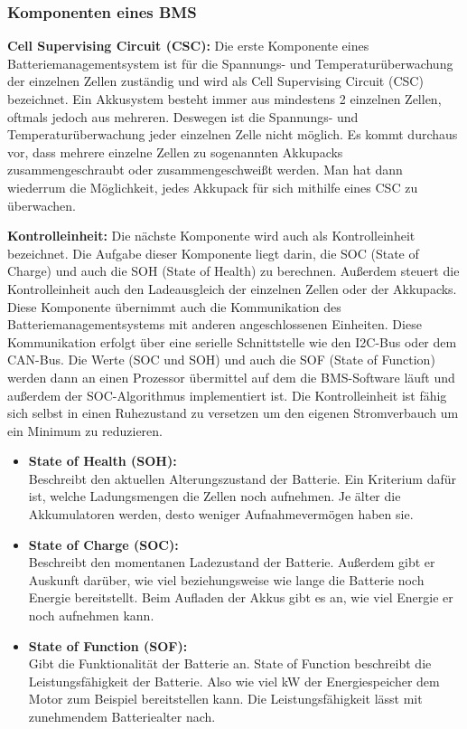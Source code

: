 \subsubsection{Komponenten eines BMS}

\textbf{Cell Supervising Circuit (CSC):}
Die erste Komponente eines Batteriemanagementsystem ist für die Spannungs- und Temperaturüberwachung der einzelnen Zellen zuständig und wird als Cell Supervising Circuit (CSC) bezeichnet. Ein Akkusystem besteht immer aus mindestens 2 einzelnen Zellen, oftmals jedoch aus mehreren. Deswegen ist die Spannungs- und Temperaturüberwachung jeder einzelnen Zelle nicht möglich. Es kommt  durchaus vor, dass mehrere einzelne Zellen zu sogenannten Akkupacks zusammengeschraubt oder zusammengeschweißt werden. Man hat dann wiederrum die Möglichkeit, jedes Akkupack für sich mithilfe eines CSC zu überwachen.

\textbf{Kontrolleinheit:}
Die nächste Komponente wird auch als Kontrolleinheit bezeichnet. Die Aufgabe dieser Komponente liegt darin, die SOC (State of Charge) und auch die SOH (State of Health) zu berechnen. Außerdem steuert die Kontrolleinheit auch den Ladeausgleich der einzelnen Zellen oder der Akkupacks. Diese Komponente übernimmt auch die Kommunikation des Batteriemanagementsystems mit anderen angeschlossenen Einheiten. Diese Kommunikation erfolgt über eine serielle Schnittstelle wie den I2C-Bus oder dem CAN-Bus. Die Werte (SOC und SOH) und auch die SOF (State of Function) werden dann an einen Prozessor übermittel auf dem die BMS-Software läuft und außerdem der SOC-Algorithmus implementiert ist. Die Kontrolleinheit ist fähig sich selbst in einen Ruhezustand zu versetzen um den eigenen Stromverbauch um ein Minimum zu reduzieren.

\begin{itemize}
	\item \textbf{State of Health (SOH):} \medskip\\
	Beschreibt den aktuellen Alterungszustand der Batterie. Ein Kriterium dafür ist, welche Ladungsmengen die Zellen noch aufnehmen. Je älter die Akkumulatoren werden, desto weniger Aufnahmevermögen haben sie.

\item \textbf{State of Charge (SOC):} \medskip\\
	Beschreibt den momentanen Ladezustand der Batterie. Außerdem gibt er Auskunft darüber, wie viel beziehungsweise wie lange die Batterie noch Energie bereitstellt. Beim Aufladen der Akkus gibt es an, wie viel Energie er noch aufnehmen kann.

\item \textbf{State of Function (SOF):} \medskip\\
	Gibt die Funktionalität der Batterie an. State of Function beschreibt die Leistungsfähigkeit der Batterie. Also wie viel kW der Energiespeicher dem Motor zum Beispiel bereitstellen kann. Die Leistungsfähigkeit lässt mit zunehmendem Batteriealter nach.
\end{itemize}

